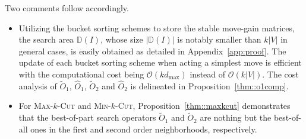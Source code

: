 \documentclass[12pt, a4paper]{article}%
\numberwithin{equation}{section}
\theoremstyle{plain}
\begin{document}
			
			
			
			Two comments follow accordingly. 
			\begin{itemize}
				\item  Utilizing the bucket sorting schemes \cite{Ma2015} to store the stable move-gain matrices, the search area $\mathbb{D}(I)$, whose size $|\mathbb{D}(I)|$ is notably smaller than $k|V|$ in general cases, is easily obtained as detailed in Appendix~\ref{app:proof}. The update of each bucket sorting scheme when acting a simplest move is efficient with the computational cost being $\mathcal{O}(kd_{\max})$ instead of $\mathcal{O}(k|V|)$. The cost analysis of $\widetilde{O}_1$, $\widehat{O}_1$, $\widetilde{O}_2$ and $\widehat{O}_2$ is delineated in Proposition~\ref{thm::o1comp}.
				\item For \textsc{Max}-$k$-\textsc{Cut} and \textsc{Min}-$k$-\textsc{Cut}, Proposition~\ref{thm::maxkcut}
				demonstrates that the best-of-part search operators $\widetilde{O}_1$ and $\widetilde{O}_2$ are nothing but the best-of-all ones in the first and second order neighborhoods, respectively. 
			\end{itemize}
			
			
			
			
			
			
			
			
			
\end{document}
